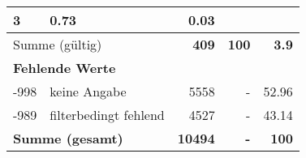 \begin{longtable}{lXrrr}
       \num{3} &
       \num[round-mode=places,round-precision=2]{0.73} &
         \num[round-mode=places,round-precision=2]{0.03} \\
     \midrule
     \multicolumn{2}{l}{Summe (gültig)} &
       \textbf{\num{409}} &
     \textbf{\num{100}} &
       \textbf{\num[round-mode=places,round-precision=2]{3.9}} \\
     \multicolumn{5}{l}{\textbf{Fehlende Werte}}\\
       -998 &
       keine Angabe &
         \num{5558} &
        - &
         \num[round-mode=places,round-precision=2]{52.96} \\
       -989 &
       filterbedingt fehlend &
         \num{4527} &
        - &
         \num[round-mode=places,round-precision=2]{43.14} \\
     \midrule
     \multicolumn{2}{l}{\textbf{Summe (gesamt)}} &
          \textbf{\num{10494}} &
        \textbf{-} &
        \textbf{\num{100}} \\
     \bottomrule
     \end{longtable}
     
